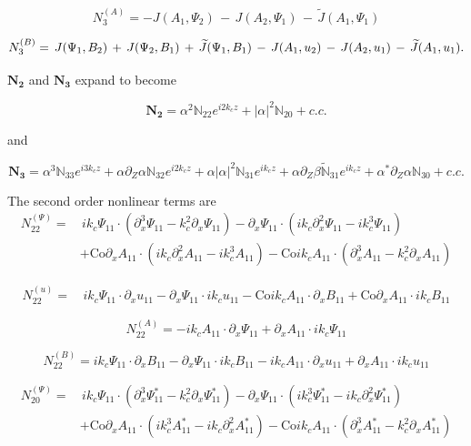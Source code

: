 \documentclass[twocolumn]{aastex61}
\newcommand{\beq}{\begin{equation}}
\newcommand{\eeq}{\end{equation}}
\newcommand{\Co}{\mathrm{Co}}
\begin{document}
\beq
N_3^{(A)} = - J(A_1, \Psi_2) \, - \, J(A_2, \Psi_1) \, - \, \widetilde{J}(A_1, \Psi_1)
\eeq

\beq
N_3^{(B)} = \, J(\Psi_1, B_2) \, + \, J(\Psi_2, B_1) \, + \, \widetilde{J}(\Psi_1, B_1) \, - \, J(A_1, u_2) \, - \,  J(A_2, u_1) \, - \, \widetilde{J}(A_1, u_1).\\
\eeq

$\mathbf{N_2}$ and $\mathbf{N_3}$ expand to become

\beq
\mathbf{N_2} = \alpha^2\mathbb{N}_{22} e^{i2 k_c z} + \left|\alpha\right|^2 \mathbb{N}_{20} + c.c.
\eeq

and

\beq
\mathbf{N_3} = \alpha^3 \mathbb{N}_{33} e^{i 3 k_c z} + \alpha\partial_Z\alpha \mathbb{N}_{32} e^{i 2 k_c z} + \alpha\left|\alpha\right|^2 \mathbb{N}_{31} e^{i k_c z} + \alpha \partial_Z  \beta \mathbb{\widetilde{N}}_{31} e^{i k_c z} + \alpha^*\partial_Z \alpha \mathbb{N}_{30} + c.c.
\eeq

The second order nonlinear terms are \\

\beq
\begin{split}
N_{22}^{(\Psi)} = & \, i k_c \Psi_{11} \cdot \left(\partial_x^3 \Psi_{11} - k_c^2 \partial_x \Psi_{11}\right) - \partial_x \Psi_{11} \cdot \left(i k_c \partial_x^2 \Psi_{11} - i k_c^3 \Psi_{11}\right) \\
& + \Co \partial_x A_{11} \cdot \left(i k_c \partial_x^2 A_{11} - i k_c^3 A_{11}\right) - \Co i k_c A_{11} \cdot \left(\partial_x^3 A_{11} - k_c^2 \partial_x A_{11}\right)
\end{split}
\eeq

\beq
\begin{split}
N_{22}^{(u)} = & \, i k_c \Psi_{11} \cdot \partial_x u_{11} - \partial_x \Psi_{11} \cdot i k_c u_{11} - \Co i k_c A_{11} \cdot \partial_x B_{11} + \Co \partial_x A_{11} \cdot i k_c B_{11}
\end{split}
\eeq

\beq
N_{22}^{(A)} = - i k_c A_{11} \cdot \partial_x \Psi_{11} + \partial_x A_{11} \cdot i k_c \Psi_{11}
\eeq

\beq
N_{22}^{(B)} = i k_c \Psi_{11} \cdot \partial_x B_{11} - \partial_x \Psi_{11} \cdot i k_c B_{11} - i k_c A_{11} \cdot \partial_x u_{11} + \partial_x A_{11} \cdot i k_c u_{11}
\eeq

\beq
\begin{split}
N_{20}^{(\Psi)} = & \, i k_c \Psi_{11} \cdot \left(\partial_x^3 \Psi_{11}^* - k_c^2 \partial_x \Psi_{11}^*\right) - \partial_x \Psi_{11} \cdot \left(i k_c^3 \Psi_{11}^* - i k_c \partial_x^2 \Psi_{11}^*\right) \\
& + \Co \partial_x A_{11} \cdot \left(i k_c^3 A_{11}^* - i k_c \partial_x^2 A_{11}^* \right) - \Co i k_c A_{11} \cdot \left(\partial_x^3 A_{11}^* - k_c^2 \partial_x A_{11}^*\right)
\end{split}
\eeq
\end{document}
